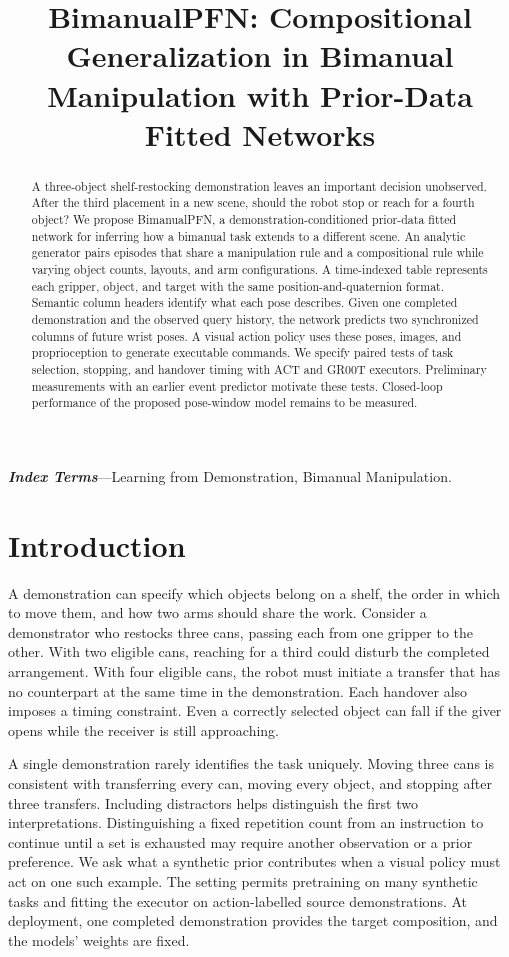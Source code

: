 \documentclass[letterpaper,10pt,conference]{ieeeconf}
\title{\LARGE\bf BimanualPFN: Compositional Generalization in Bimanual Manipulation with Prior-Data Fitted Networks}
\author{\mbox{}}
\begin{document}
\maketitle
\thispagestyle{empty}\pagestyle{empty}
\begin{abstract}
A three-object shelf-restocking demonstration leaves an important decision unobserved. After the third placement in a new scene, should the robot stop or reach for a fourth object? We propose BimanualPFN, a demonstration-conditioned prior-data fitted network for inferring how a bimanual task extends to a different scene. An analytic generator pairs episodes that share a manipulation rule and a compositional rule while varying object counts, layouts, and arm configurations. A time-indexed table represents each gripper, object, and target with the same position-and-quaternion format. Semantic column headers identify what each pose describes. Given one completed demonstration and the observed query history, the network predicts two synchronized columns of future wrist poses. A visual action policy uses these poses, images, and proprioception to generate executable commands. We specify paired tests of task selection, stopping, and handover timing with ACT and GR00T executors. Preliminary measurements with an earlier event predictor motivate these tests. Closed-loop performance of the proposed pose-window model remains to be measured.
\end{abstract}
\noindent\textbf{\textit{Index Terms}}---Learning from Demonstration, Bimanual Manipulation.

\section{Introduction}
A demonstration can specify which objects belong on a shelf, the order in which to move them, and how two arms should share the work. Consider a demonstrator who restocks three cans, passing each from one gripper to the other. With two eligible cans, reaching for a third could disturb the completed arrangement. With four eligible cans, the robot must initiate a transfer that has no counterpart at the same time in the demonstration. Each handover also imposes a timing constraint. Even a correctly selected object can fall if the giver opens while the receiver is still approaching.

A single demonstration rarely identifies the task uniquely. Moving three cans is consistent with transferring every can, moving every object, and stopping after three transfers. Including distractors helps distinguish the first two interpretations. Distinguishing a fixed repetition count from an instruction to continue until a set is exhausted may require another observation or a prior preference. We ask what a synthetic prior contributes when a visual policy must act on one such example. The setting permits pretraining on many synthetic tasks and fitting the executor on action-labelled source demonstrations. At deployment, one completed demonstration provides the target composition, and the models' weights are fixed.
\end{document}
